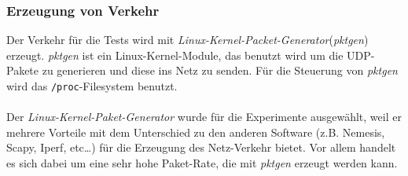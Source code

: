 \subsubsection{Erzeugung von Verkehr}
Der Verkehr für die Tests wird mit
\emph{Linux-Kernel-Packet-Generator}(\emph{pktgen})~\cite{linux_pktgen} erzeugt.
\emph{pktgen} ist ein Linux-Kernel-Module, das benutzt wird um die UDP-Pakete
zu generieren und diese ins Netz zu senden. Für die Steuerung von \emph{pktgen}
wird das \verb+/proc+-Filesystem benutzt.\\\\
Der \emph{Linux-Kernel-Paket-Generator} wurde für die Experimente ausgewählt,
weil er mehrere Vorteile mit dem Unterschied zu den anderen Software (z.B.
Nemesis, Scapy, Iperf, etc\ldots) für die Erzeugung des Netz-Verkehr bietet. Vor
allem handelt es sich dabei um eine sehr hohe Paket-Rate, die mit \emph{pktgen}
erzeugt werden kann.
%
%
